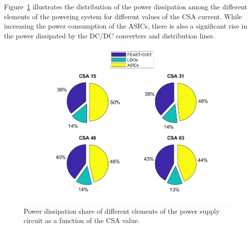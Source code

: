 Figure~\ref{fig_power_CSA} illustrates the distribution of the power dissipation among the different elements of the powering system for different values of the \gls{CSA} current. While increasing the power consumption of the \glspl{ASIC}, there is also a  significant rise in the power dissipated by the DC/DC converters and distribution lines. %

\begin{figure}[h!]
\centering
\includegraphics[width=0.6\columnwidth]{Chapter6/DCS/images/pie.png}
\caption{Power dissipation share of different elements of the power supply circuit as a function of the \gls{CSA} value.}
\label{fig_power_CSA}
\end{figure}

